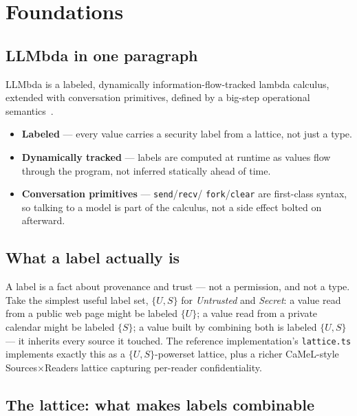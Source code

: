 \documentclass[11pt, a4paper]{article}
\begin{document}
\section{Foundations}

\subsection{LLMbda in one paragraph}

LLMbda is a labeled, dynamically information-flow-tracked lambda calculus,
extended with conversation primitives, defined by a big-step operational
semantics~\cite{llmbda}.

\begin{itemize}
  \item \textbf{Labeled} --- every value carries a security label from a
    lattice, not just a type.
  \item \textbf{Dynamically tracked} --- labels are computed at runtime as
    values flow through the program, not inferred statically ahead of
    time.
  \item \textbf{Conversation primitives} --- \lstinline{send}/\lstinline{recv}/
    \lstinline{fork}/\lstinline{clear} are first-class syntax, so talking
    to a model is part of the calculus, not a side effect bolted on
    afterward.
\end{itemize}

\subsection{What a label actually is}

A label is a fact about provenance and trust --- not a permission, and not
a type. Take the simplest useful label set, $\{U, S\}$ for
\emph{Untrusted} and \emph{Secret}: a value read from a public web page
might be labeled $\{U\}$; a value read from a private calendar might be
labeled $\{S\}$; a value built by combining both is labeled $\{U, S\}$ ---
it inherits every source it touched. The reference implementation's
\texttt{lattice.ts} implements exactly this as a $\{U,S\}$-powerset
lattice, plus a richer CaMeL-style Sources$\times$Readers lattice
capturing per-reader confidentiality.

\subsection{The lattice: what makes labels combinable}
\end{document}
